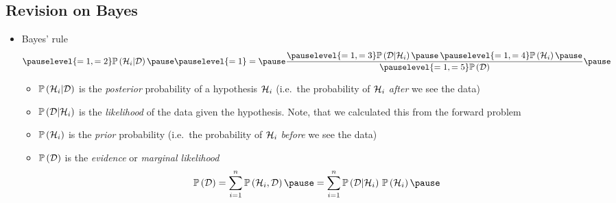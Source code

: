 
\begin{slide}
\section[-2]{Revision on Bayes}

\begin{PauseHighLight}

\begin{itemize}
\item  Bayes' rule
\begin{align*}
\pauselevel{=1, =2}\Prob{\hypo_i|\data}\pause\pauselevel{=1} =\pause
  \frac{\pauselevel{=1, =3}\Prob{\data|\hypo_i}\pause\,\pauselevel{=1, =4}\Prob{\hypo_i}\pause}{\pauselevel{=1, =5}\Prob{\data}}\pause
\end{align*}
\begin{itemize}
\item{$\mathbb{P}\left( \mathcal{H}_i|\mathcal{D} \right)$} is the \emph{posterior} probability of a
  hypothesis $\mathcal{H}_i$ (i.e.\ the probability of $\mathcal{H}_i$ \emph{after}
  we see the data)\pause{}
\item{$\mathbb{P}\left( \mathcal{D}|\mathcal{H}_i \right)$} is the \emph{likelihood} of the data given
  the hypothesis.  Note, that we calculated this from the forward
  problem\pause{}
\item{$\mathbb{P}\left( \mathcal{H}_i \right)$} is the \emph{prior} probability (i.e.\ the
  probability of $\mathcal{H}_i$ \emph{before} we see the data)\pause
\item{$\mathbb{P}\left( \mathcal{D} \right)$} is the \emph{evidence}\pause{} or \emph{marginal
    likelihood}\pauseb
  \begin{align*}
    \Prob{\data} = \sum_{i=1}^n\Prob{\hypo_i,\data}\pause
    = \sum_{i=1}^n \Prob{\data|\hypo_i} \,\Prob{\hypo_i}\pause
  \end{align*}
\end{itemize}
\end{itemize}

\end{PauseHighLight}
\end{slide}



